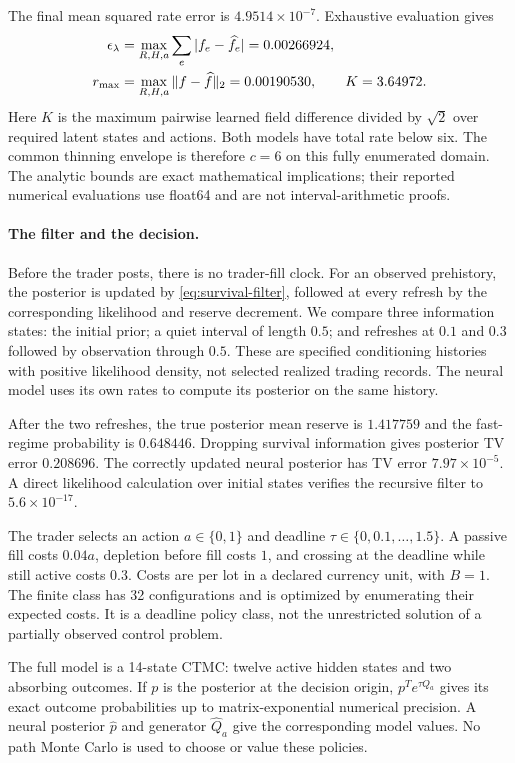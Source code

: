 The final mean squared rate error is $4.9514\times10^{-7}$. Exhaustive evaluation gives
\begin{align}\label{eq:complete-constants}
 \epsilon_\lambda&=\max_{R,H,a}\sum_e|f_e-\widehat f_e|=0.00266924,\\
 r_{\max}&=\max_{R,H,a}\|f-\widehat f\|_2=0.00190530,
 \qquad K=3.64972.\notag
\end{align}
Here $K$ is the maximum pairwise learned field difference divided by $\sqrt2$ over required latent states and actions. Both models have total rate below six. The common thinning envelope is therefore $c=6$ on this fully enumerated domain. The analytic bounds are exact mathematical implications; their reported numerical evaluations use float64 and are not interval-arithmetic proofs.

\paragraph{The filter and the decision.}
Before the trader posts, there is no trader-fill clock. For an observed prehistory, the posterior is updated by \eqref{eq:survival-filter}, followed at every refresh by the corresponding likelihood and reserve decrement. We compare three information states: the initial prior; a quiet interval of length $0.5$; and refreshes at $0.1$ and $0.3$ followed by observation through $0.5$. These are specified conditioning histories with positive likelihood density, not selected realized trading records. The neural model uses its own rates to compute its posterior on the same history.

After the two refreshes, the true posterior mean reserve is $1.417759$ and the fast-regime probability is $0.648446$. Dropping survival information gives posterior TV error $0.208696$. The correctly updated neural posterior has TV error $7.97\times10^{-5}$. A direct likelihood calculation over initial states verifies the recursive filter to $5.6\times10^{-17}$.

The trader selects an action $a\in\{0,1\}$ and deadline $\tau\in\{0,0.1,\ldots,1.5\}$. A passive fill costs $0.04a$, depletion before fill costs $1$, and crossing at the deadline while still active costs $0.3$. Costs are per lot in a declared currency unit, with $B=1$. The finite class has 32 configurations and is optimized by enumerating their expected costs. It is a deadline policy class, not the unrestricted solution of a partially observed control problem.

The full model is a 14-state CTMC: twelve active hidden states and two absorbing outcomes. If $p$ is the posterior at the decision origin, $p^Te^{\tau Q_a}$ gives its exact outcome probabilities up to matrix-exponential numerical precision. A neural posterior $\widehat p$ and generator $\widehat Q_a$ give the corresponding model values. No path Monte Carlo is used to choose or value these policies.

